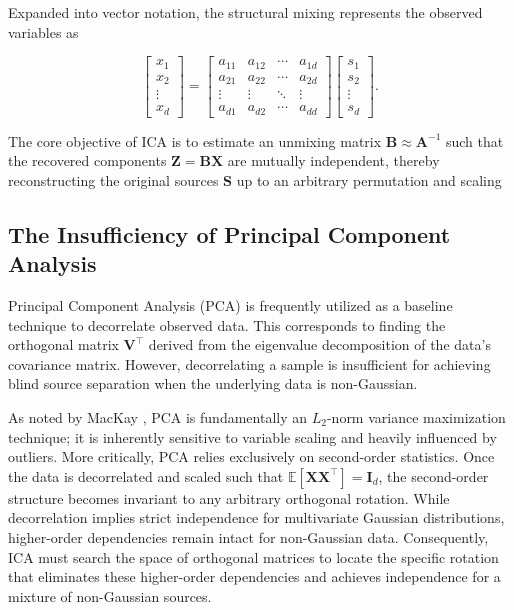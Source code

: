 \documentclass[12pt,a4paper,twoside,openany]{book}
\begin{document}
Expanded into vector notation, the structural mixing represents the observed variables as

\begin{equation}
    \begin{bmatrix}
    x_1 \\
    x_2 \\
    \vdots \\
    x_d
    \end{bmatrix}
    = 
    \begin{bmatrix}
    a_{11} & a_{12} & \cdots & a_{1d} \\
    a_{21} & a_{22} & \cdots & a_{2d} \\
    \vdots & \vdots & \ddots & \vdots \\
    a_{d1} & a_{d2} & \cdots & a_{dd}
    \end{bmatrix}
    \begin{bmatrix}
    s_1 \\
    s_2 \\
    \vdots \\
    s_d
    \end{bmatrix}.
\end{equation}

The core objective of ICA is to estimate an unmixing matrix $\mathbf{B} \approx \mathbf{A}^{-1}$ such that the recovered components $\mathbf{Z} = \mathbf{B}\mathbf{X}$ 
are mutually independent, thereby reconstructing the original sources $\mathbf{S}$ up to an arbitrary permutation and scaling

\subsection{The Insufficiency of Principal Component Analysis}

Principal Component Analysis (PCA) is frequently utilized as a baseline technique to decorrelate observed data. 
This corresponds to finding the orthogonal matrix $\mathbf{V}^\top$ derived from the eigenvalue decomposition of 
the data's covariance matrix. However, decorrelating a sample is insufficient for 
achieving blind source separation when the underlying data is non-Gaussian. 

As noted by MacKay \citeyear{mackay2003}, PCA is fundamentally an $L_2$-norm variance maximization technique; 
it is inherently sensitive to variable scaling and heavily influenced by outliers. More critically, 
PCA relies exclusively on second-order statistics. Once the data is decorrelated and scaled such that $\mathbb{E}[\mathbf{X}\mathbf{X}^\top] = \mathbf{I}_d$, 
the second-order structure becomes invariant to any arbitrary orthogonal rotation. 
While decorrelation implies strict independence for multivariate Gaussian distributions, 
higher-order dependencies remain intact for non-Gaussian data. Consequently, ICA must search the space of orthogonal matrices 
to locate the specific rotation that eliminates these higher-order dependencies and achieves independence for a mixture of non-Gaussian sources.
\end{document}
